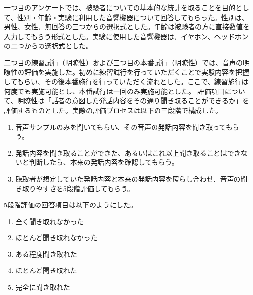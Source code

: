\documentclass[12pt]{jarticle}
\numberwithin{equation}{section}    %
\numberwithin{figure}{section}      %
\numberwithin{table}{section}      %
\begin{document}
一つ目のアンケートでは、被験者についての基本的な統計を取ることを目的として、性別・年齢・実験に利用した音響機器について回答してもらった。性別は、男性、女性、無回答の三つからの選択式とした。年齢は被験者の方に直接数値を入力してもらう形式とした。実験に使用した音響機器は、イヤホン、ヘッドホンの二つからの選択式とした。

二つ目の練習試行（明瞭性）および三つ目の本番試行（明瞭性）では、音声の明瞭性の評価を実施した。初めに練習試行を行っていただくことで実験内容を把握してもらい、その後本番施行を行っていただく流れとした。ここで、練習施行は何度でも実施可能とし、本番試行は一回のみ実施可能とした。
評価項目について、明瞭性は「話者の意図した発話内容をその通り聞き取ることができるか」を評価するものとした。実際の評価プロセスは以下の三段階で構成した。
\begin{enumerate}
    \item 音声サンプルのみを聞いてもらい、その音声の発話内容を聞き取ってもらう。
    \item 発話内容を聞き取ることができた、あるいはこれ以上聞き取ることはできないと判断したら、本来の発話内容を確認してもらう。
    \item 聴取者が想定していた発話内容と本来の発話内容を照らし合わせ、音声の聞き取りやすさを5段階評価してもらう。
\end{enumerate}
5段階評価の回答項目は以下のようにした。
\begin{enumerate}
    \item 全く聞き取れなかった
    \item ほとんど聞き取れなかった
    \item ある程度聞き取れた
    \item ほとんど聞き取れた
    \item 完全に聞き取れた
\end{enumerate}
\end{document}

